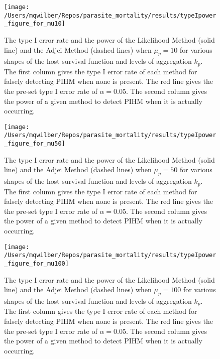 \documentclass[12pt, a4paper]{article}
\begin{document}
\begin{figure}

    \texttt{[image: /Users/mqwilber/Repos/parasite\_mortality/results/typeIpower\_figure\_for\_mu10]}

    \caption{The type I error rate and the power of the Likelihood Method (solid line) and the Adjei Method (dashed lines) when $\mu_p = 10$ for various shapes of the host survival function and levels of aggregation $k_p$.  The first column gives the type I error rate of each method for falsely detecting PIHM when none is present.  The red line gives the the pre-set type I error rate of $\alpha = 0.05$.  The second column gives the power of a given method to detect PIHM when it is actually occurring. }
    \label{fig:typeI10}

\end{figure}

\begin{figure}

    \texttt{[image: /Users/mqwilber/Repos/parasite\_mortality/results/typeIpower\_figure\_for\_mu50]}

    \caption{The type I error rate and the power of the Likelihood Method (solid line) and the Adjei Method (dashed lines) when $\mu_p = 50$ for various shapes of the host survival function and levels of aggregation $k_p$.  The first column gives the type I error rate of each method for falsely detecting PIHM when none is present.  The red line gives the the pre-set type I error rate of $\alpha = 0.05$.  The second column gives the power of a given method to detect PIHM when it is actually occurring. }
    \label{fig:typeI50}

\end{figure}

\begin{figure}

    \texttt{[image: /Users/mqwilber/Repos/parasite\_mortality/results/typeIpower\_figure\_for\_mu100]}

    \caption{The type I error rate and the power of the Likelihood Method (solid line) and the Adjei Method (dashed lines) when $\mu_p = 100$ for various shapes of the host survival function and levels of aggregation $k_p$.  The first column gives the type I error rate of each method for falsely detecting PIHM when none is present.  The red line gives the the pre-set type I error rate of $\alpha = 0.05$.  The second column gives the power of a given method to detect PIHM when it is actually occurring. }
    \label{fig:typeI100}

\end{figure}
\end{document}
